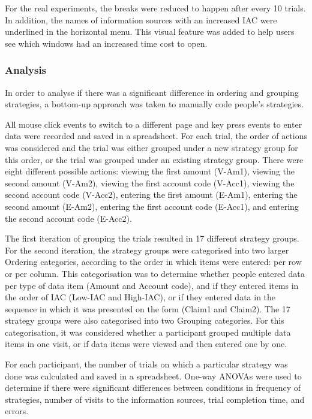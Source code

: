 For the real experiments, the breaks were reduced to happen after every 10 trials. In addition, the names of information sources with an increased IAC were underlined in the horizontal menu. This visual feature was added to help users see which windows had an increased time cost to open.

\subsubsection{Analysis}
In order to analyse if there was a significant difference in ordering and grouping strategies, a bottom-up approach was taken to manually code people's strategies.

All mouse click events to switch to a different page and key press events to enter data were recorded and saved in a spreadsheet. For each trial, the order of actions was considered and the trial was either grouped under a new strategy group for this order, or the trial was grouped under an existing strategy group. There were eight different possible actions: viewing the first amount (V-Am1), viewing the second amount (V-Am2), viewing the first account code (V-Acc1), viewing the second account code (V-Acc2), entering the first amount (E-Am1), entering the second amount (E-Am2), entering the first account code (E-Acc1), and entering the second account code (E-Acc2).

The first iteration of grouping the trials resulted in 17 different strategy groups. For the second iteration, the strategy groups were categorised into two larger Ordering categories, according to the order in which items were entered: per row or per column. This categorisation was to determine whether people entered data per type of data item (Amount and Account code), and if they entered items in the order of IAC (Low-IAC and High-IAC), or if they entered data in the sequence in which it was presented on the form (Claim1 and Claim2). The 17 strategy groups were also categorised into two Grouping categories. For this categorisation, it was considered whether a participant grouped multiple data items in one visit, or if data items were viewed and then entered one by one. 

For each participant, the number of trials on which a particular strategy was done was calculated and saved in a spreadsheet. One-way ANOVAs were used to determine if there were significant differences between conditions in frequency of strategies, number of visits to the information sources, trial completion time, and errors. 

